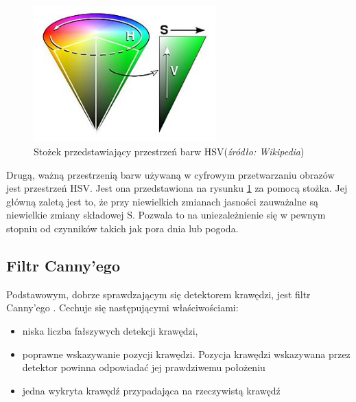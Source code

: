 \begin{figure}
  \centering
  \includegraphics[width=7cm]{img/hsv.jpg}
  \caption{Stożek przedstawiający przestrzeń barw HSV(\textit{źródło: Wikipedia})}
  \label{fig:hsv}
\end{figure}

Drugą, ważną przestrzenią barw używaną w cyfrowym przetwarzaniu obrazów jest przestrzeń HSV. 
Jest ona przedstawiona na rysunku \ref{fig:hsv} za pomocą stożka. 
Jej główną zaletą jest to, że przy niewielkich zmianach jasności zauważalne są niewielkie zmiany składowej S. 
Pozwala to na uniezależnienie się w pewnym stopniu od czynników takich jak pora dnia lub pogoda.

\subsection{Filtr Canny'ego}
Podstawowym, dobrze sprawdzającym się detektorem krawędzi, jest filtr Canny'ego \cite{T5}. 
Cechuje się następującymi właściwościami: 

\begin{itemize}
\item niska liczba fałszywych detekcji krawędzi,
\item poprawne wskazywanie pozycji krawędzi. Pozycja krawędzi wskazywana przez detektor powinna odpowiadać jej prawdziwemu położeniu
\item jedna wykryta krawędź przypadająca na rzeczywistą krawędź
\end{itemize}

